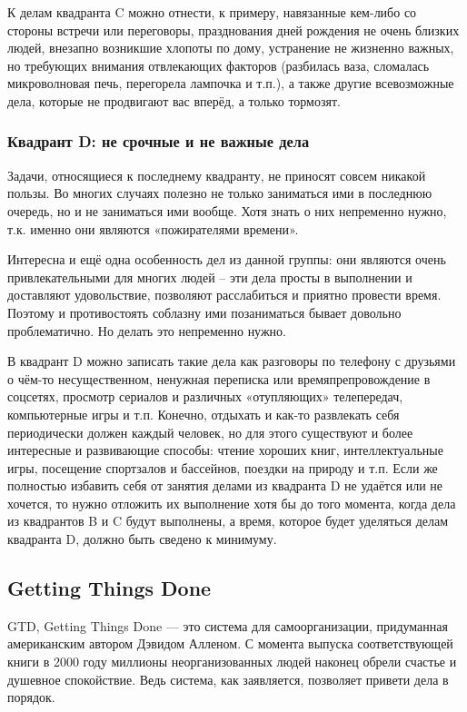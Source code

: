 К делам квадранта C можно отнести, к примеру, навязанные кем-либо со стороны встречи или переговоры, празднования дней рождения не очень близких людей, внезапно возникшие хлопоты по дому, устранение не жизненно важных, но требующих внимания отвлекающих факторов (разбилась ваза, сломалась микроволновая печь, перегорела лампочка и т.п.), а также другие всевозможные дела, которые не продвигают вас вперёд, а только тормозят.

\subsubsection{Квадрант D: не срочные и не важные дела }


Задачи, относящиеся к последнему квадранту, не приносят совсем никакой пользы. Во многих случаях полезно не только заниматься ими в последнюю очередь, но и не заниматься ими вообще. Хотя знать о них непременно нужно, т.к. именно они являются «пожирателями времени».

Интересна и ещё одна особенность дел из данной группы: они являются очень привлекательными для многих людей – эти дела просты в выполнении и доставляют удовольствие, позволяют расслабиться и приятно провести время. Поэтому и противостоять соблазну ими позаниматься бывает довольно проблематично. Но делать это непременно нужно.

В квадрант D можно записать такие дела как разговоры по телефону с друзьями о чём-то несущественном, ненужная переписка или времяпрепровождение в соцсетях, просмотр сериалов и различных «отупляющих» телепередач, компьютерные игры и т.п. Конечно, отдыхать и как-то развлекать себя периодически должен каждый человек, но для этого существуют и более интересные и развивающие способы: чтение хороших книг, интеллектуальные игры, посещение спортзалов и бассейнов, поездки на природу и т.п. Если же полностью избавить себя от занятия делами из квадранта D не удаётся или не хочется, то нужно отложить их выполнение хотя бы до того момента, когда дела из квадрантов B и C будут выполнены, а время, которое будет уделяться делам квадранта D, должно быть сведено к минимуму.

\subsection{ Getting Things Done }

GTD, Getting Things Done — это система для самоорганизации, придуманная американским автором Дэвидом Алленом. С момента выпуска соответствующей книги в 2000 году миллионы неорганизованных людей наконец обрели счастье и душевное спокойствие. Ведь система, как заявляется, позволяет привети дела в порядок.

